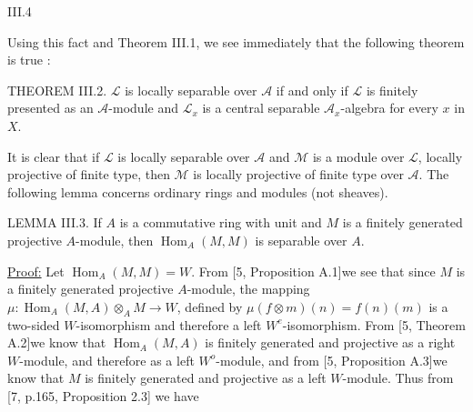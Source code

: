 
III.4

Using this fact and Theorem III.1, we see immediately that the
following theorem is true :

THEOREM III.2. $\mathcal L$ is locally separable over $\mathcal A$ if and only if $\mathcal L$
is finitely presented as an $\mathcal A$-module and $\mathcal L_x$ is a central separable
$\mathcal A_x$-algebra for every $x$ in $X$.

It is clear that if $\mathcal L$ is locally separable over $\mathcal A$ and $\mathcal M$ is a
module over $\mathcal L$, locally projective of finite type, then $\mathcal M$ is locally
projective of finite type over $\mathcal A$. The following lemma concerns
ordinary rings and modules (not sheaves).

LEMMA III.3. If $A$ is a commutative ring with unit and $M$ is a
finitely generated projective $A$-module, then $\operatorname{Hom}_A(M,M)$ is separable
over $A$.

\uline{Proof:} Let $\operatorname{Hom}_A(M,M)=W$. From [5, Proposition A.1]we
see that since $M$ is a finitely generated projective $A$-module, the
mapping $\mu:\operatorname{Hom}_A(M,A)\otimes_A M\to W$, defined by
$\mu(f\otimes m)(n)=f(n)(m)$ is a two-sided $W$-isomorphism and
therefore a left $W^e$-isomorphism. From [5, Theorem A.2]we
know that $\operatorname{Hom}_A(M,A)$ is finitely generated and projective as a right
$W$-module, and therefore as a left $W^o$-module, and from [5,
Proposition A.3]we know that $M$ is finitely generated and projective
as a left $W$-module. Thus from [7, p.165, Proposition 2.3] we have
